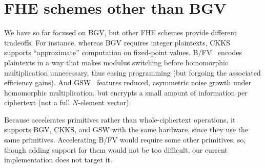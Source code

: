 



\section{FHE schemes other than BGV}
\label{sec:fhe_others}

We have so far focused on BGV, but other FHE schemes provide different
tradeoffs.  For instance, whereas BGV requires integer
plaintexts, CKKS~\cite{cheon:ictaci17:homomorphic} supports ``approximate'' computation on fixed-point values.
B/FV~\cite{brakerski:crypto12:fully,fan:iacr12:somewhat} encodes
plaintexts in a way that makes modulus switching before 
homomorphic multiplication unnecessary, thus easing programming (but forgoing the
associated efficiency gains). And
GSW~\cite{gentry:crypto13:homomorphic} features reduced, asymmetric
noise growth under homomorphic multiplication, but encrypts a
small amount of information per ciphertext (not a full
$N$-element vector).

Because \name accelerates primitives rather than whole\hyp{}ciphertext
operations, it supports BGV, CKKS, and GSW with the same hardware,
since they use the same primitives.  Accelerating B/FV would require
some other primitives, so, though adding support for them would not be
too difficult, our current implementation does not target it.

